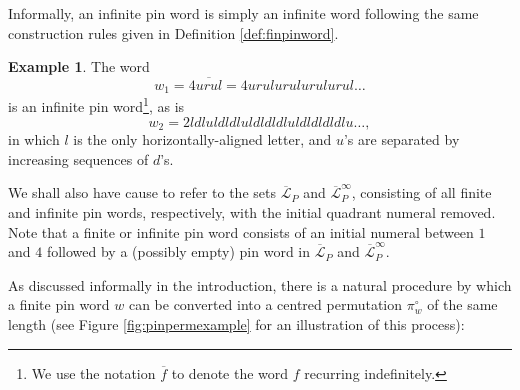 \documentclass[11pt,a4paper]{article}
\theoremstyle{definition}
\newtheorem{example}[thm]{Example}
\begin{document}
Informally, an infinite pin word is simply an infinite word following the same construction rules given in Definition \ref{def:finpinword}.

\begin{example}
The word
\[
w_{1} = 4\overline{urul} = 4urulurulurulurul\dots
\]
is an infinite pin word\footnote{We use the notation $\overline{f}$ to denote the word $f$ recurring indefinitely.}, as is
\[
w_{2} = 2ldluldldluldldldluldldldldlu\dots,
\]
in which $l$ is the only horizontally-aligned letter, and $u$'s are separated by increasing sequences of $d$'s.
\end{example}

We shall also have cause to refer to the sets $\overline{\mathcal{L}}_{P}$ and $\overline{\mathcal{L}}^{\infty}_{P}$, consisting of all finite and infinite pin words, respectively, with the initial quadrant numeral removed. Note that a finite or infinite pin word consists of an initial numeral between $1$ and $4$ followed by a (possibly empty) pin word in $\overline{\mathcal{L}}_{P}$ and $\overline{\mathcal{L}}^{\infty}_{P}$.

As discussed informally in the introduction, there is a natural procedure by which a finite pin word $w$ can be converted into a centred permutation $\pi_{w}^{\circ}$ of the same length (see Figure \ref{fig:pinpermexample} for an illustration of this process):
\end{document}
